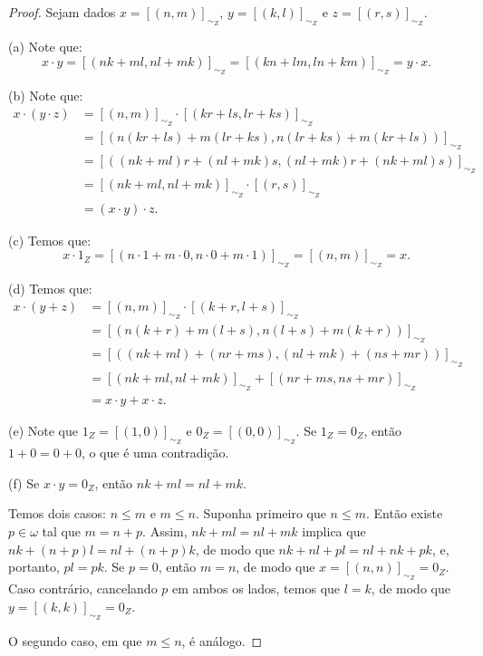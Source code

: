 \begin{proof}Sejam dados $x=[(n, m)]_{\sim_Z}$, $y=[(k, l)]_{\sim_Z}$ e $z=[(r, s)]_{\sim_Z}$.

    (a) Note que:
    \[
        x\cdot y=[(nk+ml, nl+mk)]_{\sim_Z}=[(kn+lm, ln+km)]_{\sim_Z}=y\cdot x.
    \]

    (b) Note que:
    \begin{align*}
        x\cdot (y\cdot z) & = [(n, m)]_{\sim_Z}\cdot [(kr+ls, lr+ks)]_{\sim_Z} \\
        & = [(n(kr+ls)+m(lr+ks), n(lr+ks)+m(kr+ls))]_{\sim_Z} \\
        & = [((nk+ml)r+(nl+mk)s, (nl+mk)r+(nk+ml)s)]_{\sim_Z} \\
        & = [(nk+ml, nl+mk)]_{\sim_Z}\cdot [(r, s)]_{\sim_Z} \\
        & = (x\cdot y)\cdot z.
    \end{align*}

    (c) Temos que:
    \[
        x\cdot 1_Z=[(n\cdot 1+m\cdot 0, n\cdot 0+m\cdot 1)]_{\sim_Z}=[(n, m)]_{\sim_Z}=x.
    \]

    (d) Temos que:
    \begin{align*}
        x\cdot (y+z) & = [(n, m)]_{\sim_Z}\cdot [(k+r, l+s)]_{\sim_Z} \\
        & = [(n(k+r)+m(l+s), n(l+s)+m(k+r))]_{\sim_Z} \\
        & = [((nk+ml)+(nr+ms), (nl+mk)+(ns+mr))]_{\sim_Z} \\
        & = [(nk+ml, nl+mk)]_{\sim_Z}+[(nr+ms, ns+mr)]_{\sim_Z} \\
        & = x\cdot y+x\cdot z.
    \end{align*}

    (e) Note que $1_Z=[(1, 0)]_{\sim_Z}$ e $0_Z=[(0, 0)]_{\sim_Z}$.
    Se $1_Z=0_Z$, então $1+0=0+0$, o que é uma contradição.

    (f) Se $x\cdot y=0_Z$, então $nk+ml=nl+mk$.
    
    Temos dois casos: $n\leq m$ e $m\leq n$.
    Suponha primeiro que $n\leq m$.
    Então existe $p \in \omega$ tal que $m=n+p$.
    Assim, $nk+ml=nl+mk$ implica que $nk+(n+p)l=nl+(n+p)k$, de modo que $nk+nl+pl=nl+nk+pk$, e, portanto, $pl=pk$.
    Se $p=0$, então $m=n$, de modo que $x=[(n, n)]_{\sim_Z}=0_Z$.
    Caso contrário, cancelando $p$ em ambos os lados, temos que $l=k$, de modo que $y=[(k, k)]_{\sim_Z}=0_Z$.

    O segundo caso, em que $m\leq n$, é análogo.
\end{proof}

